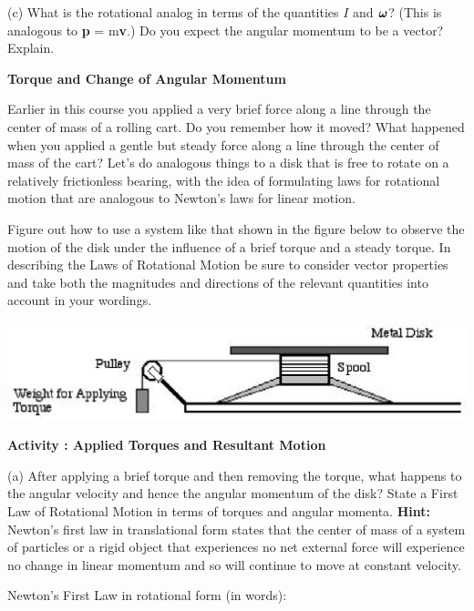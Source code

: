 (c) What is the rotational analog in terms of the quantities $I$ and \( 
\mbox{\boldmath$\omega$}  \)? (This is analogous to \textbf{p} = m\textbf{v}.)
Do you expect the angular momentum to be a vector? Explain.
\vspace{30mm}

\textbf{Torque and Change of Angular Momentum }

Earlier in this course you applied a very brief force along a line through the
center of mass of a rolling cart. Do you remember how it moved? What happened
when you applied a gentle but steady force along a line through the center of
mass of the cart? Let's do analogous things to a disk that is free to rotate
on a relatively frictionless bearing, with the idea of formulating laws for
rotational motion that are analogous to Newton's laws for linear motion. 

Figure out how to use a system like that shown in the figure below to observe
the motion of the disk under the influence of a brief torque and a steady torque.
In describing the Laws of Rotational Motion be sure to consider vector properties
and take both the magnitudes and directions of the relevant quantities into
account in your wordings. 

\vspace{0.3cm}
{\par\centering \includegraphics{ang_mom/ang_mom_fig6.eps} \par}
\vspace{0.3cm}

\textbf{Activity  : Applied Torques and Resultant Motion }

(a) After applying a brief torque and then removing the torque, what happens to the angular velocity and hence the angular momentum of the
disk? State a First Law of Rotational Motion in terms of torques and angular momenta. \textbf{Hint:} Newton's first law in translational form states that the center of mass of a system of particles or a rigid object that experiences no net external force will experience no change in linear momentum and so will continue to move at constant velocity.

Newton's First Law in rotational form (in words):
\vspace{20mm}

